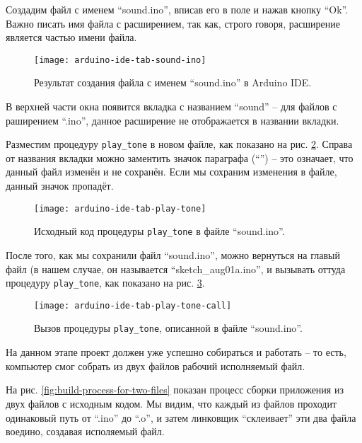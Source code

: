\documentclass[../sparc.tex]{subfiles}
\begin{document}
Создадим файл с именем ``sound.ino'', вписав его в поле и нажав кнопку ``Ok''.
Важно писать имя файла с расширением, так как, строго говоря, расширение
является частью имени файла.

\begin{figure}[H]
  \centering
  \texttt{[image: arduino-ide-tab-sound-ino]}
  \caption{Результат создания файла с именем ``sound.ino'' в Arduino IDE.}
  \label{fig:arduino-ide-tab-sound-ino}
\end{figure}

В верхней части окна появится вкладка с названием ``sound'' -- для файлов с
раширением ``.ino'', данное расширение не отображается в названии вкладки.

Разместим процедуру \texttt{play_tone} в новом файле, как показано на
рис. \ref{fig:arduino-ide-tab-play-tone}.  Справа от названия вкладки можно
заментить значок параграфа (``\textsection'') -- это означает, что данный файл изменён и не
сохранён.  Если мы сохраним изменения в файле, данный значок пропадёт.

\begin{figure}[H]
  \centering
  \texttt{[image: arduino-ide-tab-play-tone]}
  \caption{Исходный код процедуры \texttt{play_tone} в файле ``sound.ino''.}
  \label{fig:arduino-ide-tab-play-tone}
\end{figure}

После того, как мы сохранили файл ``sound.ino'', можно вернуться на главый файл
(в нашем случае, он называется ``sketch\_aug01a.ino'', и вызывать оттуда
процедуру \texttt{play_tone}, как показано на
рис. \ref{fig:arduino-ide-tab-play-tone-call}.

\begin{figure}[H]
  \centering
  \texttt{[image: arduino-ide-tab-play-tone-call]}
  \caption{Вызов процедуры \texttt{play_tone}, описанной в файле
    ``sound.ino''.}
  \label{fig:arduino-ide-tab-play-tone-call}
\end{figure}

На данном этапе проект должен уже успешно собираться и работать -- то есть,
компьютер смог собрать из двух файлов рабочий исполняемый файл.


На рис. \ref{fig:build-process-for-two-files} показан процесс сборки приложения
из двух файлов с исходным кодом.  Мы видим, что каждый из файлов проходит
одинаковый путь от ``.ino'' до ``.o'', и затем линковщик ``склеивает'' эти два
файла воедино, создавая исполяемый файл.
\end{document}
